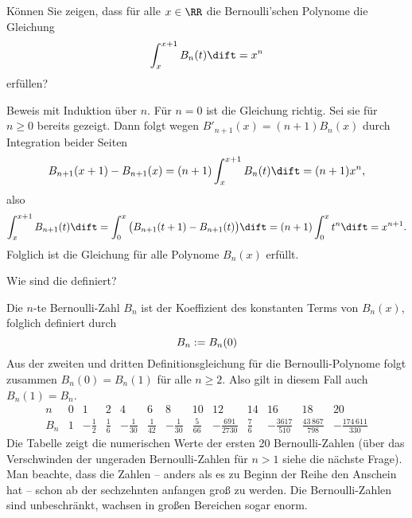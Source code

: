   \begin{frage}
    Können Sie zeigen, dass für alle $x\in \RR$ die 
    Bernoulli'schen Polynome die Gleichung 
    \[
    \int_x^{x+1} B_n (t ) \dift = x^n 
    \]
    erfüllen?
  \end{frage}

  \begin{antwort}
    Beweis mit Induktion über $n$. Für $n=0$ ist die Gleichung richtig. 
    Sei sie für $n\ge 0$ bereits gezeigt. Dann folgt 
    wegen $B'_{n+1}(x)=(n+1)B_n(x)$ durch Integration beider Seiten
    \[
    B_{n+1}(x+1)-B_{n+1}(x)= (n+1) \int_x^{x+1} B_n (t) \dift = (n+1) x^n,
    \]
    also 
    \[
    \int_x^{x+1} B_{n+1}(t) \dift = 
    \int_0^x \big( B_{n+1}(t+1)-B_{n+1}(t) \big)\dift = 
    (n+1) \int_0^x t^n \dift = x^{n+1}.
    \]
    Folglich ist die Gleichung für alle Polynome $B_n(x)$ erfüllt. 
    \AntEnd    
  \end{antwort} 

  \begin{frage}
    Wie sind die  definiert?
  \end{frage}

  \begin{antwort}
    Die $n$-te Bernoulli-Zahl $B_n$ ist 
    der Koeffizient des konstanten Terms von $B_n(x)$, 
    folglich definiert durch 
    \begin{equation}
      B_n := B_n(0)
      \notag
    \end{equation}
    Aus der zweiten und dritten Definitionsgleichung für die 
    Bernoulli-Polynome folgt zusammen $B_n(0)=B_n(1)$ 
    für alle $n\ge 2$. Also gilt in diesem Fall auch $B_n(1)=B_n$. 
    \[
    \begin{array}{c|cccccccccccc}
      n & 0 & 1 & 2 & 4 & 6 & 8 & 10 & 12 & 14 & 16 & 18 & 20 \\ \hline
      B_n & 1 & -\frac{1}{2} & \frac{1}{6} & -\frac{1}{30} & \frac{1}{42} 
      & -\frac{1}{30} & \frac{5}{66} &  -\frac{691}{2730} & \frac{7}{6} 
      & -\frac{3617}{510} & \frac{43\,867}{798} & 
      -\frac{174\,611}{330} 
    \end{array}
    \]
    Die Tabelle zeigt die numerischen Werte der ersten 20 Bernoulli-Zahlen 
    (über das Verschwinden der ungeraden Bernoulli-Zahlen für $n>1$ siehe 
    die nächste Frage). Man beachte, dass die Zahlen -- anders als es zu Beginn 
    der Reihe den Anschein hat -- schon ab der sechzehnten 
    anfangen groß zu werden. Die Bernoulli-Zahlen 
    sind unbeschränkt, wachsen in großen Bereichen sogar enorm. 
    \AntEnd
  \end{antwort}

